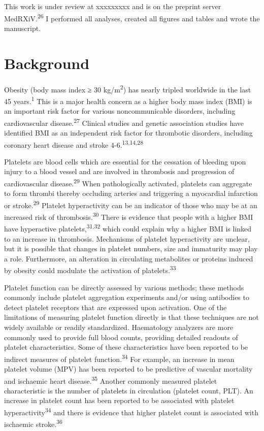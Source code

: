 \documentclass[11pt,twoside]{bristolthesis}
\begin{document}
This work is under review at xxxxxxxxx and is on the preprint server MedRXiV.\textsuperscript{26} I performed all analyses, created all figures and tables and wrote the manuscript.

\hypertarget{background-2}{%
\section{Background}\label{background-2}}

Obesity (body mass index ≥ 30 kg/m\textsuperscript{2}) has nearly tripled worldwide in the last 45 years.\textsuperscript{1} This is a major health concern as a higher body mass index (BMI) is an important risk factor for various noncommunicable disorders, including cardiovascular disease.\textsuperscript{27} Clinical studies and genetic association studies have identified BMI as an independent risk factor for thrombotic disorders, including coronary heart disease and stroke 4-6.\textsuperscript{13,14,28}

Platelets are blood cells which are essential for the cessation of bleeding upon injury to a blood vessel and are involved in thrombosis and progression of cardiovascular disease.\textsuperscript{29} When pathologically activated, platelets can aggregate to form thrombi thereby occluding arteries and triggering a myocardial infarction or stroke.\textsuperscript{29} Platelet hyperactivity can be an indicator of those who may be at an increased risk of thrombosis.\textsuperscript{30} There is evidence that people with a higher BMI have hyperactive platelets,\textsuperscript{31,32} which could explain why a higher BMI is linked to an increase in thrombosis. Mechanisms of platelet hyperactivity are unclear, but it is possible that changes in platelet numbers, size and immaturity may play a role. Furthermore, an alteration in circulating metabolites or proteins induced by obesity could modulate the activation of platelets.\textsuperscript{33}

Platelet function can be directly assessed by various methods; these methods commonly include platelet aggregation experiments and/or using antibodies to detect platelet receptors that are expressed upon activation. One of the limitations of measuring platelet function directly is that these techniques are not widely available or readily standardized. Haematology analyzers are more commonly used to provide full blood counts, providing detailed readouts of platelet characteristics. Some of these characteristics have been reported to be indirect measures of platelet function.\textsuperscript{34} For example, an increase in mean platelet volume (MPV) has been reported to be predictive of vascular mortality and ischaemic heart disease.\textsuperscript{35} Another commonly measured platelet characteristic is the number of platelets in circulation (platelet count, PLT). An increase in platelet count has been reported to be associated with platelet hyperactivity\textsuperscript{34} and there is evidence that higher platelet count is associated with ischaemic stroke.\textsuperscript{36}
\end{document}
